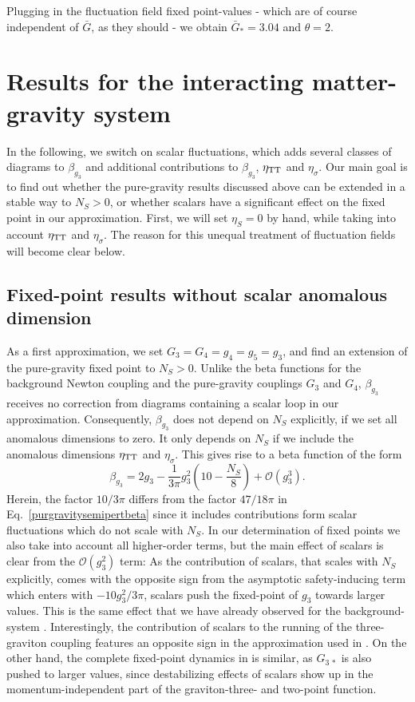 \documentclass[twocolumn,prd,superscriptaddress,preprintnumbers,amsmath,amssymb,nofootinbib]{revtex4}
\newcommand{\be}{\begin{equation}}
\newcommand{\ee}{\end{equation}}
\begin{document}
Plugging in the fluctuation field fixed point-values - which are of course independent of $\bar{G}$, as they should - we obtain $\bar{G}_{\ast} = 3.04$ and $\theta=2$.



\section{Results for the interacting matter-gravity system}
In the following, we switch on scalar fluctuations, which adds several classes of diagrams to $\beta_{g_3}$ and additional contributions to $\beta_{g_3}$, $\eta_{\rm TT}$ and $\eta_{\sigma}$. Our main goal is to find out whether the pure-gravity results discussed above can be extended in a stable way to $N_S>0$, or whether scalars have a significant effect on the fixed point in our approximation. First, we will set $\eta_S=0$ by hand, while taking into account $\eta_{\rm TT}$ and $\eta_{\sigma}$. The reason for this unequal treatment of fluctuation fields will become clear below.


%
\subsection{Fixed-point results without scalar anomalous dimension}
%
As a first approximation, we set $G_3=G_4=g_4=g_5=g_3$, and find an extension of the pure-gravity fixed point to $N_S>0$. Unlike the beta functions for the background Newton coupling and the pure-gravity couplings $G_3$ and $G_4$, $\beta_{g_3}$ receives no correction from diagrams containing a scalar loop  in our approximation. Consequently, $\beta_{g_3}$ does not depend on $N_S$ explicitly, if we set all anomalous dimensions to zero. 
It only depends on $N_S$ if we include the anomalous dimensions $\eta_{\rm TT}$ and $\eta_{\sigma}$.
This gives rise to a beta function of the form
\be
\beta_{g_3}= 2g_3 -\frac{1}{3\pi}g_3^2\left(10-\frac{N_S}{8}\right)
+\mathcal{O}(g_3^3).
\label{norma}
\ee
Herein, the factor $10/3\pi$ differs from the  factor $47/18\pi$ in Eq.~\eqref{purgravitysemipertbeta} since it includes contributions form scalar fluctuations which do not scale with $N_S$.
In our determination of fixed points we also take into account all higher-order terms, but the main effect of scalars is clear from the $\mathcal{O}(g_3^2)$ term: As the contribution of scalars, that scales with $N_S$ explicitly, comes with the opposite sign from the asymptotic safety-inducing term which enters with $-10g_3^2/3\pi$, scalars push the fixed-point of $g_3$ towards larger values. This is the same effect that we have already observed for the background-system \cite{Dona:2013qba}. Interestingly, the contribution of scalars to the running of the three-graviton coupling features an opposite sign in the approximation used in \cite{Meibohm:2015twa}. On the other hand, the complete fixed-point dynamics in \cite{Meibohm:2015twa} is similar, as $G_{3\,\ast}$ is also pushed to larger values, since destabilizing effects of scalars show up in the momentum-independent part of the graviton-three- and two-point function.
\end{document}
